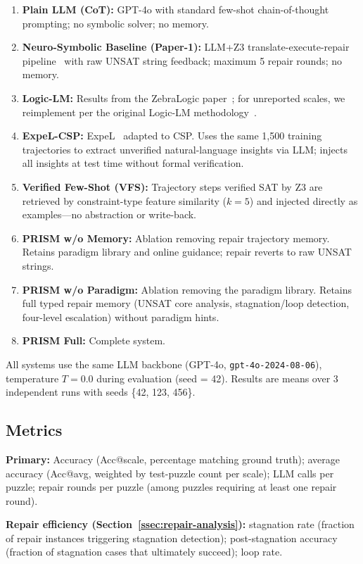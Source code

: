 \begin{enumerate}
    \item \textbf{Plain LLM (CoT):} GPT-4o with standard few-shot chain-of-thought prompting; no symbolic solver; no memory.
    \item \textbf{Neuro-Symbolic Baseline (Paper-1):} LLM+Z3 translate-execute-repair pipeline~\citep{Olausson2023} with raw UNSAT string feedback; maximum 5 repair rounds; no memory.
    \item \textbf{Logic-LM:} Results from the ZebraLogic paper~\citep{Lin2025}; for unreported scales, we reimplement per the original Logic-LM methodology~\citep{Pan2023}.
    \item \textbf{ExpeL-CSP:} ExpeL~\citep{Zhao2024} adapted to CSP. Uses the same 1,500 training trajectories to extract unverified natural-language insights via LLM; injects all insights at test time without formal verification.
    \item \textbf{Verified Few-Shot (VFS):} Trajectory steps verified SAT by Z3 are retrieved by constraint-type feature similarity ($k = 5$) and injected directly as examples—no abstraction or write-back.
    \item \textbf{PRISM w/o Memory:} Ablation removing repair trajectory memory. Retains paradigm library and online guidance; repair reverts to raw UNSAT strings.
    \item \textbf{PRISM w/o Paradigm:} Ablation removing the paradigm library. Retains full typed repair memory (UNSAT core analysis, stagnation/loop detection, four-level escalation) without paradigm hints.
    \item \textbf{PRISM Full:} Complete system.
\end{enumerate}

All systems use the same LLM backbone (GPT-4o, \texttt{gpt-4o-2024-08-06}), temperature $T = 0.0$ during evaluation (seed = 42). Results are means over 3 independent runs with seeds \{42, 123, 456\}.

\subsection{Metrics}

\textbf{Primary:} Accuracy (Acc@scale, percentage matching ground truth); average accuracy (Acc@avg, weighted by test-puzzle count per scale); LLM calls per puzzle; repair rounds per puzzle (among puzzles requiring at least one repair round).

\textbf{Repair efficiency (Section~\ref{ssec:repair-analysis}):} stagnation rate (fraction of repair instances triggering stagnation detection); post-stagnation accuracy (fraction of stagnation cases that ultimately succeed); loop rate.

